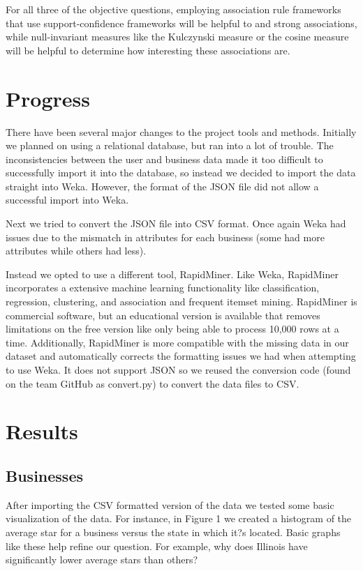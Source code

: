 \quad For all three of the objective questions, employing association rule frameworks that use support-confidence frameworks will be helpful to and strong associations, while null-invariant measures like the Kulczynski measure or the cosine measure will be helpful to determine how interesting these associations are.

\section{Progress}

\quad There have been several major changes to the project tools and methods. Initially we planned on using a relational database, but ran into a lot of trouble. The inconsistencies between the user and business data made it too difficult to successfully import it into the database, so instead we decided to import the data straight into Weka. However, the format of the JSON file did not allow a successful import into Weka. 

\quad Next we tried to convert the JSON file into CSV format. Once again Weka had issues due to the mismatch in attributes for each business (some had more attributes while others had less). 

\quad Instead we opted to use a different tool, RapidMiner. Like Weka, RapidMiner incorporates a extensive machine learning functionality like classification, regression, clustering, and association and frequent itemset mining. RapidMiner is commercial software, but an educational version is available that removes limitations on the free version like only being able to process 10,000 rows at a time. Additionally, RapidMiner is more compatible with the missing data in our dataset and automatically corrects the formatting issues we had when attempting to use Weka. It does not support JSON so we reused the conversion code (found on the team GitHub as convert.py) to convert the data files to CSV. 

\section{Results}

\subsection{Businesses}

\quad After importing the CSV formatted version of the data we tested some basic visualization of the data. For instance, in Figure 1 we created a histogram of the average star for a business versus the state in which it?s located. Basic graphs like these help refine our question. For example, why does Illinois have significantly lower average stars than others? 

